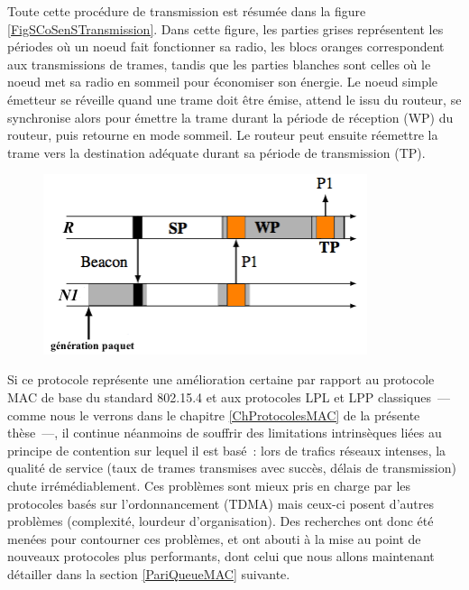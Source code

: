 Toute cette procédure de transmission est résumée dans la figure
\vref{FigSCoSenSTransmission}. Dans cette figure, les parties grises
représentent les périodes où un noeud fait fonctionner sa radio,
les blocs oranges correspondent aux transmissions de trames, tandis que
les parties blanches sont celles où le noeud met sa radio en sommeil pour
économiser son énergie. Le noeud simple émetteur se réveille quand une
trame doit être émise, attend le  issu du routeur,
se synchronise alors pour émettre la trame durant la période de réception
(WP) du routeur, puis retourne en mode sommeil. Le routeur peut ensuite
réemettre la trame vers la destination adéquate durant sa période
de transmission (TP).

\begin{figure}[!hbt]
\centering
\includegraphics[width=9.5cm]{images/ch3-s-cosens-transmission.png}
\label{FigSCoSenSTransmission}
\end{figure}

\bigskip

Si ce protocole représente une amélioration certaine par rapport
au protocole MAC de base du standard 802.15.4 et aux protocoles
LPL et LPP classiques~--- comme nous le verrons dans le chapitre
\ref{ChProtocolesMAC} de la présente thèse~---, il continue néanmoins
de souffrir des limitations intrinsèques liées au principe de contention
sur lequel il est basé~: lors de trafics réseaux intenses, la qualité
de service (taux de trames transmises avec succès, délais de
transmission) chute irrémédiablement. Ces problèmes sont mieux
pris en charge par les protocoles basés sur l'ordonnancement
(TDMA) mais ceux-ci posent d'autres problèmes (complexité,
lourdeur d'organisation). Des recherches ont donc été menées
pour contourner ces problèmes, et ont abouti à la mise au
point de nouveaux protocoles plus performants, dont celui
que nous allons maintenant détailler dans la section
\ref{PariQueueMAC} suivante.

